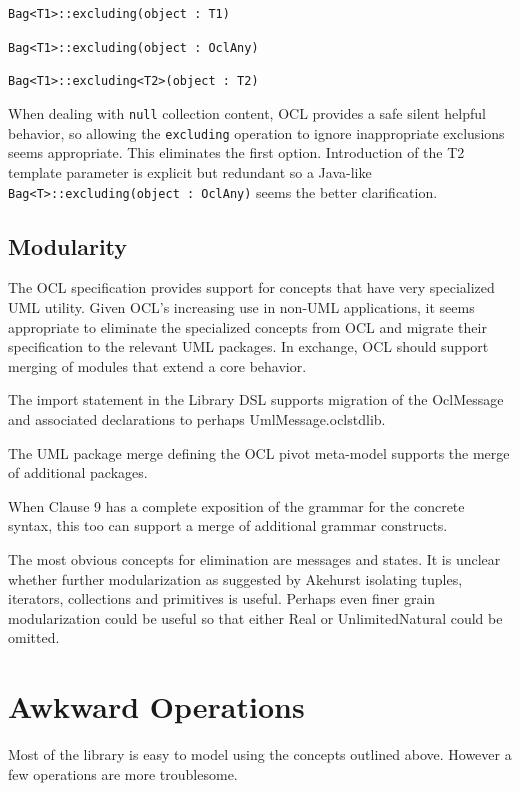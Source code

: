 \documentclass{eceasst}
\begin{document}
\verb|Bag<T1>::excluding(object : T1)|

\verb|Bag<T1>::excluding(object : OclAny)|

\verb|Bag<T1>::excluding<T2>(object : T2)|

When dealing with \verb|null| collection content, OCL provides a safe silent helpful behavior, so allowing the \verb|excluding| operation to ignore inappropriate exclusions seems appropriate. This eliminates the first option. Introduction of the T2 template parameter is explicit but redundant so a Java-like \verb| Bag<T>::excluding(object : OclAny)| seems the better clarification.

\subsection{Modularity}

The OCL specification provides support for concepts that have very specialized UML utility. Given OCL's increasing use in non-UML applications, it seems appropriate to eliminate the specialized concepts from OCL and migrate their specification to the relevant UML packages. In exchange, OCL should support merging of modules that extend a core behavior\cite{Chimiak-Opaka}.

The import statement in the Library DSL supports migration of the OclMessage and associated declarations to perhaps UmlMessage.oclstdlib.

The UML package merge defining the OCL pivot meta-model\cite{OCL-UML} supports the merge of additional packages.

When Clause 9 has a complete exposition of the grammar for the concrete syntax, this too can support a merge of additional grammar constructs. 

The most obvious concepts for elimination are messages and states. It is unclear whether further modularization as suggested by Akehurst\cite{Akehurst} isolating tuples, iterators, collections and primitives is useful. Perhaps even finer grain modularization could be useful so that either Real or UnlimitedNatural could be omitted.

\section{Awkward Operations}\label{AwkwardOperations}

Most of the library is easy to model using the concepts outlined above. However a few operations are more troublesome.
\end{document}
